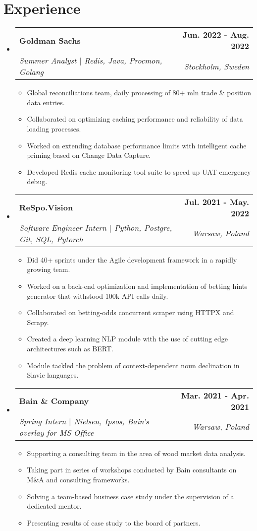 \documentclass[letterpaper,11pt]{article}
\makeatletter
\newcommand{\resumeItem}[1]{
  \item\small{
    {#1 \vspace{-2pt}}
  }
}
\newcommand{\resumeSubheading}[4]{
  \vspace{-2pt}\item
    \begin{tabular*}{1.0\textwidth}[t]{l@{\extracolsep{\fill}}r}
      \textbf{#1} & \textbf{\small #2} \\
      \textit{\small#3} & \textit{\small #4} \\
    \end{tabular*}\vspace{-7pt}
}
\newcommand{\resumeSubHeadingListStart}{\begin{itemize}[leftmargin=0.0in, label={}]}
\newcommand{\resumeSubHeadingListEnd}{\end{itemize}}
\newcommand{\resumeItemListStart}{\begin{itemize}}
\newcommand{\resumeItemListEnd}{\end{itemize}\vspace{-5pt}}
\makeatother
\begin{document}
\section{Experience}
  \resumeSubHeadingListStart
  
      \resumeSubheading
      {Goldman Sachs}{Jun. 2022 - Aug. 2022}
      {Summer Analyst $|$ Redis, Java, Procmon, Golang }{Stockholm, Sweden}
      \resumeItemListStart
        \resumeItem{ Global reconciliations team, daily processing of 80+ mln trade \& position data entries.}
        \resumeItem{ Collaborated on optimizing caching performance and reliability of data loading processes.}
        \resumeItem{ Worked on extending database performance limits with intelligent cache priming based on Change Data Capture.}
        \resumeItem{ Developed Redis cache monitoring tool suite to speed up UAT emergency debug.}
      \resumeItemListEnd

    \resumeSubheading
      {ReSpo.Vision}{Jul. 2021 - May. 2022}
      {Software Engineer Intern $|$  Python, Postgre, Git, SQL, Pytorch}{Warsaw, Poland}
      \resumeItemListStart
        \resumeItem{ Did 40+ sprints under the Agile development framework in a rapidly growing team.}
        \resumeItem{ Worked on a back-end optimization and implementation of betting hints generator that withstood 100k API calls daily.}
        \resumeItem{ Collaborated on betting-odds  concurrent scraper using HTTPX and Scrapy.}
        \resumeItem{ Created a deep learning NLP module with the use of cutting edge architectures such as BERT.}
        \resumeItem{ Module tackled the problem of context-dependent noun declination in Slavic languages.}
      \resumeItemListEnd

    \resumeSubheading
      {Bain \& Company}{Mar. 2021 - Apr. 2021}
      {Spring Intern $|$ Nielsen, Ipsos, Bain's overlay for MS Office}{Warsaw, Poland}
      \resumeItemListStart
        \resumeItem{Supporting a consulting team in the area of wood market data analysis.}
        \resumeItem{Taking part in series of workshops conducted by Bain consultants on M\&A and consulting frameworks.}
        \resumeItem{Solving a team-based business case study under the supervision of a dedicated mentor.}
        \resumeItem{Presenting results of case study to the board of partners.}
    \resumeItemListEnd
    
  \resumeSubHeadingListEnd
\vspace{-16pt}

\end{document}
